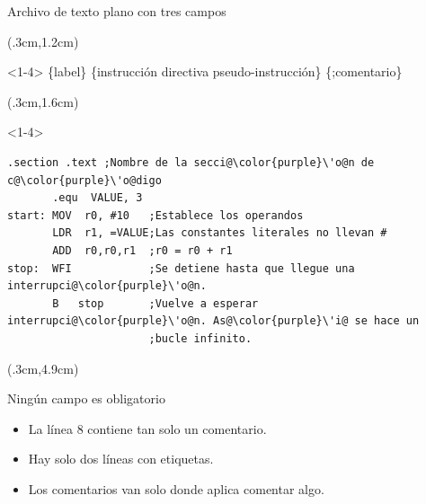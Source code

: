 \documentclass[usenames,table,dvipsnames,aspectratio=169]{beamer}
\begin{document}
\begin{frame}[fragile]{Archivo de texto plano con tres campos}
 \begin{textblock*}{\textwidth}(.3cm,1.2cm)
  \begin{onlyenv}<1-4>
   \{label\} \{instrucción \textbar directiva \textbar pseudo-instrucción\} \{;comentario\}
  \end{onlyenv}
 \end{textblock*}
 \begin{textblock*}{\textwidth}(.3cm,1.6cm)
  \begin{onlyenv}<1-4>
   \begin{lstlisting}[escapechar=\@,]
       .section .text ;Nombre de la secci@\color{purple}\'o@n de c@\color{purple}\'o@digo
       .equ  VALUE, 3
start: MOV  r0, #10   ;Establece los operandos
       LDR  r1, =VALUE;Las constantes literales no llevan #
       ADD  r0,r0,r1  ;r0 = r0 + r1
stop:  WFI            ;Se detiene hasta que llegue una interrupci@\color{purple}\'o@n.
       B   stop       ;Vuelve a esperar interrupci@\color{purple}\'o@n. As@\color{purple}\'i@ se hace un
                      ;bucle infinito.
   \end{lstlisting}
  \end{onlyenv}
 \end{textblock*}
 \begin{textblock*}{\textwidth}(.3cm,4.9cm)
  \begin{block}{Ningún campo es obligatorio}
   \begin{itemize}[<+(1)->] \justifying
    \item La línea 8 contiene tan solo un comentario.
    \item Hay solo dos líneas con etiquetas.
    \item Los comentarios van solo donde aplica comentar algo.
   \end{itemize}
  \end{block}
 \end{textblock*}
\end{frame}
\end{document}
